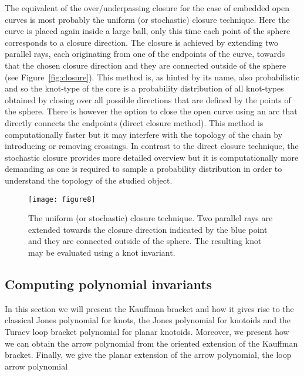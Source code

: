 The equivalent of the over/underpassing closure for the case of embedded open curves is most probably the uniform (or stochastic) closure technique\cite{mansfield1994, sulkowska2012, lua2006,millett2004, jamroz2014}.
Here the curve is placed again inside a large ball, only this time each point of the sphere corresponds to a closure direction. The closure is achieved by extending two parallel rays, each originating from one of the endpoints of the curve, towards that the chosen closure direction and they are connected outside of the sphere (see Figure~\ref{fig:closure}).
This method is, as hinted by its name, also probabilistic and so the knot-type of the core is a probability distribution of all knot-types obtained by closing over all possible directions that are defined by the points of the sphere.
There is however the option to close the open curve using an arc that directly connects the endpoints\cite{taylor2000,virnau2006} (direct closure method). This method is computationally faster but it may interfere with the topology of the chain by introducing or removing crossings. In contrast to the direct closure technique, the stochastic closure provides more detailed overview but it is computationally more demanding as one is required to sample a probability distribution in order to understand the topology of the studied object.
\begin{figure}[h]
\centering
\texttt{[image: figure8]}
\caption{The uniform (or stochastic) closure technique. Two parallel rays are extended towards the closure direction indicated by the blue point and they are connected outside of the sphere. The resulting knot may be evaluated using a knot invariant.}\label{fig:stochastic}
\end{figure}

\subsection{\label{sec:theory:jones}Computing polynomial invariants}
In this section we will present the Kauffman bracket\cite{kauffman1988} and how it gives rise to the classical Jones polynomial for knots\cite{jones}, the Jones polynomial for knotoids\cite{turaev,guka} and the Turaev loop bracket polynomial for planar knotoids\cite{turaev}. Moreover, we present how we can obtain the arrow polynomial \cite{dye2009,guka} from the oriented extension of the Kauffman bracket. Finally, we give the planar extension of the arrow polynomial, the loop arrow polynomial \cite{gound2, goundaroulis2019}

